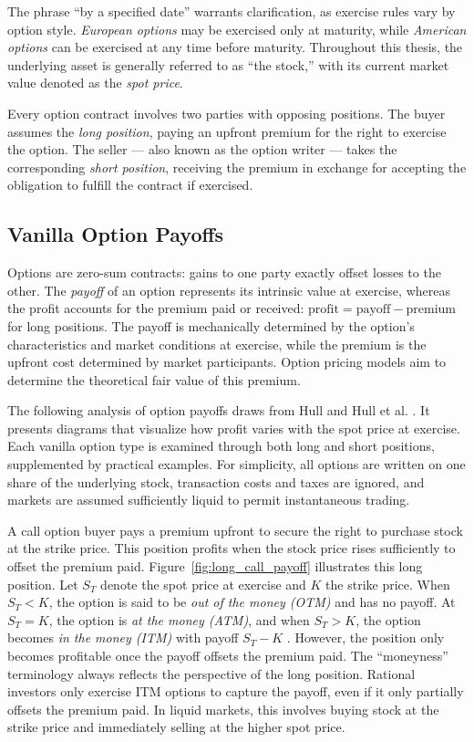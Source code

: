 \documentclass[english,12pt,a4paper,pdftex,sci,utf8]{aaltothesis}
\begin{document}
The phrase ``by a specified date'' warrants clarification, as exercise rules vary by option style. \emph{European options} may be exercised only at maturity, while \emph{American options} can be exercised at any time before maturity. Throughout this thesis, the underlying asset is generally referred to as ``the stock,'' with its current market value denoted as the \emph{spot price}.

Every option contract involves two parties with opposing positions. The buyer assumes the \emph{long position}, paying an upfront premium for the right to exercise the option. The seller --- also known as the option writer --- takes the corresponding \emph{short position}, receiving the premium in exchange for accepting the obligation to fulfill the contract if exercised.

\clearpage
\subsection{Vanilla Option Payoffs}\label{subsec:payoffs}

Options are zero-sum contracts: gains to one party exactly offset losses to the other. The \emph{payoff} of an option represents its intrinsic value at exercise, whereas the profit accounts for the premium paid or received: \mbox{$\text{profit} = \text{payoff} - \text{premium}$} for long positions. The payoff is mechanically determined by the option's characteristics and market conditions at exercise, while the premium is the upfront cost determined by market participants. Option pricing models aim to determine the theoretical fair value of this premium.

The following analysis of option payoffs draws from Hull \cite{hull2016options} and Hull et al. \cite{hull2013fundamentals}. It presents diagrams that visualize how profit varies with the spot price at exercise. Each vanilla option type is examined through both long and short positions, supplemented by practical examples. For simplicity, all options are written on one share of the underlying stock, transaction costs and taxes are ignored, and markets are assumed sufficiently liquid to permit instantaneous trading.

A call option buyer pays a premium upfront to secure the right to purchase stock at the strike price. This position profits when the stock price rises sufficiently to offset the premium paid. Figure~\ref{fig:long_call_payoff} illustrates this long position. Let $S_T$ denote the spot price at exercise and $K$ the strike price. When $S_T < K$, the option is said to be \emph{out of the money (OTM)} and has no payoff. At $S_T = K$, the option is \emph{at the money (ATM)}, and when $S_T > K$, the option becomes \emph{in the money (ITM)} with payoff $S_T - K$ \cite{hull2013fundamentals}. However, the position only becomes profitable once the payoff offsets the premium paid. The ``moneyness'' terminology always reflects the perspective of the long position. Rational investors only exercise ITM options to capture the payoff, even if it only partially offsets the premium paid. In liquid markets, this involves buying stock at the strike price and immediately selling at the higher spot price.
\end{document}
